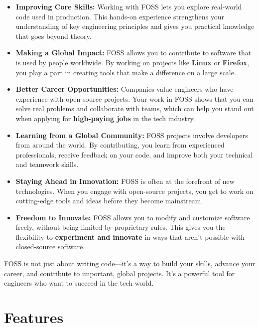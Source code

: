 \documentclass[12pt,a4paper]{article}
\begin{document}
\begin{itemize} \item \textbf{Improving Core Skills:} Working with FOSS lets you explore real-world code used in production. This hands-on experience strengthens your understanding of key engineering principles and gives you practical knowledge that goes beyond theory.

\item \textbf{Making a Global Impact:} FOSS allows you to contribute to software that is used by people worldwide. By working on projects like \textbf{Linux} or \textbf{Firefox}, you play a part in creating tools that make a difference on a large scale.

\item \textbf{Better Career Opportunities:} Companies value engineers who have experience with open-source projects. Your work in FOSS shows that you can solve real problems and collaborate with teams, which can help you stand out when applying for \textbf{high-paying jobs} in the tech industry.

\item \textbf{Learning from a Global Community:} FOSS projects involve developers from around the world. By contributing, you learn from experienced professionals, receive feedback on your code, and improve both your technical and teamwork skills.

\item \textbf{Staying Ahead in Innovation:} FOSS is often at the forefront of new technologies. When you engage with open-source projects, you get to work on cutting-edge tools and ideas before they become mainstream.

\item \textbf{Freedom to Innovate:} FOSS allows you to modify and customize software freely, without being limited by proprietary rules. This gives you the flexibility to \textbf{experiment and innovate} in ways that aren't possible with closed-source software.

\end{itemize}

FOSS is not just about writing code—it’s a way to build your skills, advance your career, and contribute to important, global projects. It’s a powerful tool for engineers who want to succeed in the tech world.

\section{Features}
\end{document}
